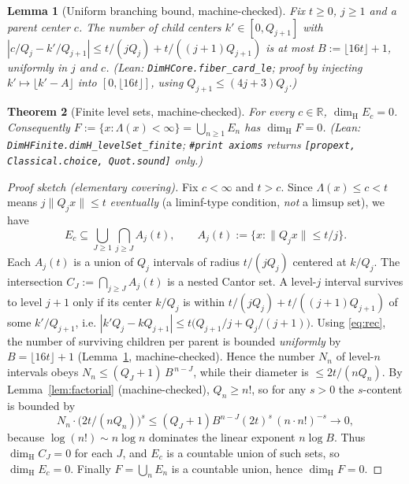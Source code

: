 \documentclass[11pt]{article}
\newtheorem{theorem}{Theorem}
\newtheorem{lemma}[theorem]{Lemma}
\theoremstyle{definition}
\theoremstyle{remark}
\newcommand{\R}{\mathbb{R}}
\newcommand{\dimH}{\dim_{\mathrm{H}}}
\newcommand{\Lam}{\Lambda}
\begin{document}
\begin{lemma}[Uniform branching bound, machine-checked]\label{lem:branch}
Fix $t\ge0$, $j\ge1$ and a parent center $c$. The number of child centers
$k'\in[0,Q_{j+1}]$ with $|c/Q_j-k'/Q_{j+1}|\le t/(jQ_j)+t/((j+1)Q_{j+1})$ is at
most $B:=\lfloor16t\rfloor+1$, \emph{uniformly in $j$ and $c$}.
(Lean: \texttt{DimHCore.fiber\_card\_le}; proof by injecting $k'\mapsto
\lfloor k'-A\rfloor$ into $[0,\lfloor16t\rfloor]$, using $Q_{j+1}\le(4j+3)Q_j$.)
\end{lemma}

\begin{theorem}[Finite level sets, machine-checked]\label{thm:finite}
For every $c\in\R$, $\dimH E_c=0$. Consequently
$F:=\{x:\Lam(x)<\infty\}=\bigcup_{n\ge1}E_n$ has $\dimH F=0$.
(Lean: \texttt{DimHFinite.dimH\_levelSet\_finite}; \texttt{\#print axioms}
returns \texttt{[propext, Classical.choice, Quot.sound]} only.)
\end{theorem}

\begin{proof}[Proof sketch (elementary covering)]
Fix $c<\infty$ and $t>c$. Since $\Lam(x)\le c<t$ means $j\|Q_jx\|\le t$
\emph{eventually} (a liminf-type condition, \emph{not} a limsup set), we have
\[
E_c\subseteq\bigcup_{J\ge1}\bigcap_{j\ge J}A_j(t),\qquad
A_j(t):=\{x:\|Q_jx\|\le t/j\}.
\]
Each $A_j(t)$ is a union of $Q_j$ intervals of radius $t/(jQ_j)$ centered at
$k/Q_j$. The intersection $C_J:=\bigcap_{j\ge J}A_j(t)$ is a nested Cantor set.
A level-$j$ interval survives to level $j+1$ only if its center $k/Q_j$ is
within $t/(jQ_j)+t/((j+1)Q_{j+1})$ of some $k'/Q_{j+1}$, i.e.
$|k'Q_j-kQ_{j+1}|\le t\bigl(Q_{j+1}/j+Q_j/(j+1)\bigr)$. Using
\eqref{eq:rec}, the number of surviving children per parent is bounded
\emph{uniformly} by $B=\lfloor16t\rfloor+1$ (Lemma~\ref{lem:branch},
machine-checked). Hence the number $N_n$ of level-$n$ intervals obeys
$N_n\le (Q_J+1)\,B^{\,n-J}$, while their diameter is $\le 2t/(nQ_n)$. By
Lemma~\ref{lem:factorial} (machine-checked), $Q_n\ge n!$, so for any $s>0$ the
$s$-content is bounded by
\[
N_n\cdot\bigl(2t/(nQ_n)\bigr)^{s}\le (Q_J+1) B^{n-J}(2t)^{s}\,(n\cdot n!)^{-s}
\longrightarrow0,
\]
because $\log(n!)\sim n\log n$ dominates the linear exponent $n\log B$. Thus
$\dimH C_J=0$ for each $J$, and $E_c$ is a countable union of such sets, so
$\dimH E_c=0$. Finally $F=\bigcup_nE_n$ is a countable union, hence
$\dimH F=0$.
\end{proof}
\end{document}

